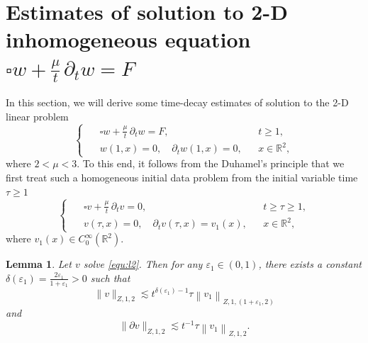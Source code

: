 \documentclass[11pt,twoside]{article}
\newcommand{\R}{\mathbb R}
\newcommand{\p}{\partial}
\newcommand{\f}{\frac}
\theoremstyle{plain}
\newtheorem{lemma}[theorem]{Lemma}
\theoremstyle{definition}
\theoremstyle{remark}
\numberwithin{equation}{section}
\begin{document}
\section{Estimates of solution to 2-D inhomogeneous equation $\square w+\f{\mu}{t}\,\p_tw=F$}\label{sec4}
In this section, we will derive some time-decay estimates of solution to the 2-D linear problem
\begin{equation}\label{equ:l1}
\left\{ \enspace
\begin{aligned}
&\square w+\f{\mu}{t}\,\p_tw=F, &&
t\geq 1,\\
&w(1,x)=0, \quad \partial_{t} w(1,x)=0, &&x\in\R^2,
\end{aligned}
\right.
\end{equation}
where $2<\mu<3$. To this end,  it follows from the  Duhamel's  principle that we first treat such a
homogeneous initial data problem from the initial variable time $\tau\ge 1$
\begin{equation}\label{equ:l2}
\left\{ \enspace
\begin{aligned}
&\square v+\f{\mu}{t}\,\p_tv=0, &&
t\geq \tau \geq1,\\
&v(\tau,x)=0, \quad \partial_{t} v(\tau,x)=v_1( x), &&x\in\R^2,
\end{aligned}
\right.
\end{equation}
where $v_1(x)\in C_0^{\infty}(\R^2)$.
\begin{lemma}\label{lem4}
Let $v$ solve \eqref{equ:l2}. Then for any $\varepsilon_1\in(0, 1)$, there exists a constant
$\delta(\varepsilon_1)=\f{2\varepsilon_1}{1+\varepsilon_1}>0$ such that
\begin{equation}\label{equ:l3}
\|v\|_{Z, 1, 2} \lesssim t^{\delta(\varepsilon_1)-1}\tau\left\|v_1\right\|_{Z, 1,(1+\varepsilon_1, 2)}
\end{equation}
and
\begin{equation}\label{equ:l4}
\|\p v\|_{Z, 1, 2} \lesssim t^{-1}\tau\left\|v_1\right\|_{Z, 1,2}.
\end{equation}
\end{lemma}
\end{document}
